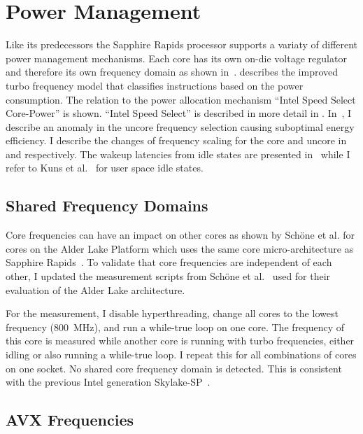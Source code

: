 \chapter{Power Management}
\label{sec:power_management}

Like its predecessors the Sapphire Rapids processor supports a variaty of different power management mechanisms.
Each core has its own on-die voltage regulator and therefore its own frequency domain as shown in~.
 describes the improved turbo frequency model that classifies instructions based on the power consumption.
The relation to the power allocation mechanism ``Intel Speed Select Core-Power'' is shown.
``Intel Speed Select'' is described in more detail in .
In~, I describe an anomaly in the uncore frequency selection causing suboptimal energy efficiency.
I describe the changes of frequency scaling for the core and uncore in~ and  respectively.
The wakeup latencies from idle states are presented in~ while I refer to Kuns et al.~\cite{Kuns_2025_UserSpaceIdle} for user space idle states.

\section{Shared Frequency Domains}
\label{sec:shared_freq_domains}
Core frequencies can have an impact on other cores as shown by Schöne et al. for cores on the Alder Lake Platform which uses the same core micro-architecture as Sapphire Rapids~\cite{Schoene_2024_Alder_Lake}.
To validate that core frequencies are independent of each other, I updated the measurement scripts from Sch\"one et al.~\cite{Schoene_2024_Alder_Lake} used for their evaluation of the Alder Lake architecture.

For the measurement, I disable hyperthreading, change all cores to the lowest frequency (\SI{800}{\MHz}), and run a while-true loop on one core.
The frequency of this core is measured while another core is running with turbo frequencies, either idling or also running a while-true loop.
I repeat this for all combinations of cores on one socket.
No shared core frequency domain is detected.
This is consistent with the previous Intel generation Skylake-SP~\cite[Sec. 2.6.3]{Intel_Optimization_Reference_Manual_050}.

\section{AVX Frequencies}
\label{sec:avx-frequencies}

